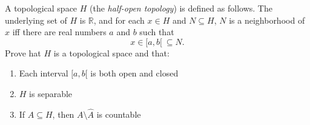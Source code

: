 \documentclass[12pt]{article}
\newenvironment{problem}[2][Problem]{\begin{trivlist}
\item[\hskip \labelsep {\bfseries #1}\hskip \labelsep {\bfseries #2.}]}{\end{trivlist}}
\begin{document}
\begin{problem}{9}
  A topological space $H$ (the \textit{half-open topology}) is defined as follows.
  The underlying set of $H$ is $\mathbb{R}$, and for each $x\in H$ and $N\subseteq H$, 
  $N$ is a neighborhood of $x$ iff there are real numbers $a$ and $b$ such that
  \begin{equation*}
    x\in[a,b[\ \subseteq N.
  \end{equation*}
  \indent Prove hat $H$ is a topological space and that:
  \begin{enumerate}
    \item Each interval $[a,b[$ is both open and closed
    \item $H$ is separable
    \item If $A\subseteq H$, then $A\setminus\widehat{A}$ is countable
  \end{enumerate}
\end{problem}
\end{document}
